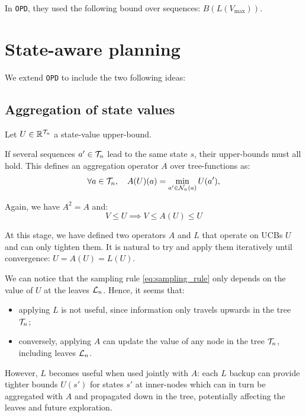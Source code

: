 \documentclass{article}
\begin{document}
In \texttt{OPD}, they used the following bound over sequences: $B\left(L\left(V_{\max}\right)\right)$.

\section{State-aware planning}

We extend \texttt{OPD} to include the two following ideas:

\subsection{Aggregation of state values}
\label{sec:aggregation}

Let $U\in\mathbb{R}^{\mathcal{T}_n}$ a state-value upper-bound.

\begin{definition}
If several sequences $a'\in\mathcal{T}_n$ lead to the same state $s$, their upper-bounds must all hold. This defines an aggregation operator $A$ over tree-functions as:
    \begin{equation}
    \label{eq:aggregation}
        \forall a\in\mathcal{T}_n, \quad A(U)(a) = \min_{a'\in \mathcal{N}_n(a)} U(a'),
    \end{equation}
    
Again, we have $A^2=A$ and:
\begin{equation*}
    V \leq U \implies V \leq A(U) \leq U
\end{equation*}
\end{definition}

At this stage, we have defined two operators $A$ and $L$ that operate on UCBs $U$ and can only tighten them. It is natural to try and apply them iteratively until convergence: $U = A(U) = L(U)$.


\begin{remark}
We can notice that the sampling rule \eqref{eq:sampling_rule} only depends on the value of $U$ at the leaves $\mathcal{L}_n$. Hence, it seems that:
\begin{itemize}
    \item applying $L$ is not useful, since information only travels upwards in the tree $\mathcal{T}_n$;
    \item conversely, applying $A$ can update the value of any node in the tree $\mathcal{T}_n$, including leaves $\mathcal{L}_n$.
\end{itemize}
However, $L$ becomes useful when used jointly with $A$: each $L$ backup can provide tighter bounds $U(s')$ for states $s'$ at inner-nodes which can in turn be aggregated with $A$ and propagated down in the tree, potentially affecting the leaves and future exploration. 
\end{remark}
\end{document}

